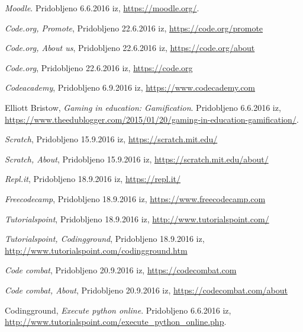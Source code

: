 \begin{thebibliography}{9}
 \emph{Moodle}. Pridobljeno 6.6.2016 iz,
  \url{https://moodle.org/}.

 \emph{Code.org, Promote}, Pridobljeno
  22.6.2016 iz, \url{https://code.org/promote}

 \emph{Code.org, About us}, Pridobljeno
  22.6.2016 iz, \url{https://code.org/about}

 \emph{Code.org}, Pridobljeno
  22.6.2016 iz, \url{https://code.org}


 \emph{Codeacademy}, Pridobljeno 6.9.2016 iz,
  \url{https://www.codecademy.com}

 Elliott Bristow, \emph{Gaming in education: Gamification}. Pridobljeno 6.6.2016 iz,
  \url{https://www.theedublogger.com/2015/01/20/gaming-in-education-gamification/}.

 \emph{Scratch}, Pridobljeno 15.9.2016 iz,
  \url{https://scratch.mit.edu/}

 \emph{Scratch, About}, Pridobljeno 15.9.2016 iz,
  \url{https://scratch.mit.edu/about/}

 \emph{Repl.it}, Pridobljeno 18.9.2016 iz,
  \url{https://repl.it/}

 \emph{Freecodecamp}, Pridobljeno 18.9.2016 iz,
  \url{https://www.freecodecamp.com}

 \emph{Tutorialspoint}, Pridobljeno 18.9.2016 iz,
  \url{http://www.tutorialspoint.com/}

 \emph{Tutorialspoint,
    Codingground}, Pridobljeno 18.9.2016 iz,
  \url{http://www.tutorialspoint.com/codingground.htm}

 \emph{Code combat}, Pridobljeno 20.9.2016 iz,
  \url{https://codecombat.com}

 \emph{Code combat, About}, Pridobljeno 20.9.2016 iz,
  \url{https://codecombat.com/about}









 Codingground, \emph{Execute python
    online}. Pridobljeno 6.6.2016 iz,
  \url{http://www.tutorialspoint.com/execute_python_online.php}.






\end{thebibliography}

